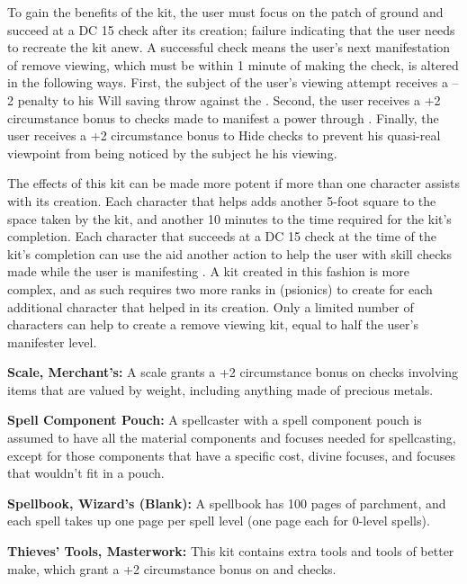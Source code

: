 To gain the benefits of the kit, the user must focus on the  patch of ground and succeed at a DC 15   check after its creation; failure indicating that the user needs  to recreate the kit anew. A successful check means the user's  next manifestation of remove viewing, which must be within  1 minute of making the check, is altered in the following  ways. First, the subject of the user's viewing attempt  receives a –2 penalty to his Will saving throw against the  . Second, the user receives a +2 circumstance  bonus to  checks made to manifest a power  through . Finally, the user receives a +2  circumstance bonus to Hide checks to prevent his quasi-real  viewpoint from being noticed by the subject he his viewing.

The effects of this kit can be made more potent if more  than one character assists with its creation. Each character  that helps adds another 5-foot square to the space taken by  the kit, and another 10 minutes to the time required for the  kit's completion. Each character that succeeds at a DC 15   check at the time of the kit's completion can  use the aid another action to help the user with skill checks  made while the user is manifesting . A kit  created in this fashion is more complex, and as such  requires two more ranks in  (psionics) to create  for each additional character that helped in its creation.  Only a limited number of characters can help to create a  remove viewing kit, equal to half the user's manifester level.

\textbf{Scale, Merchant's:} A scale grants a +2 circumstance bonus on  checks involving items that are valued by weight, including anything made of precious metals.

\textbf{Spell Component Pouch:} A spellcaster with a spell component pouch is assumed to have all the material components and focuses needed for spellcasting, except for those components that have a specific cost, divine focuses, and focuses that wouldn't fit in a pouch.

\textbf{Spellbook, Wizard's (Blank):} A spellbook has 100 pages of parchment, and each spell takes up one page per spell level (one page each for 0-level spells).

\textbf{Thieves' Tools, Masterwork:} This kit contains extra tools and tools of better make, which grant a +2 circumstance bonus on  and  checks.

